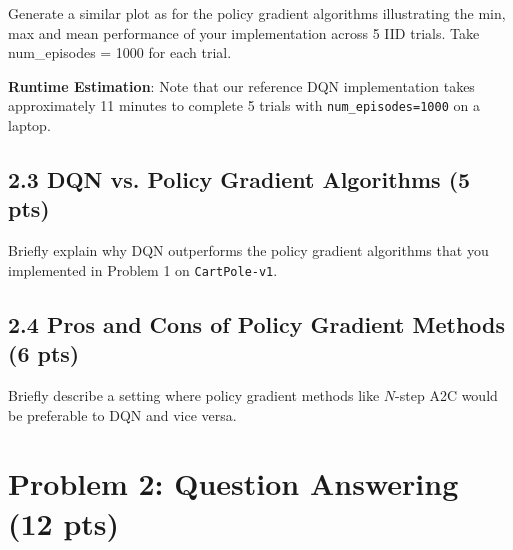 \documentclass[12pt]{article}
\begin{document}
Generate a similar plot as for the policy gradient algorithms illustrating the min, max and mean performance of your implementation across 5 IID trials. Take num\_episodes = 1000 for each trial. 

\textbf{Runtime Estimation}: Note that our reference DQN implementation takes approximately 11 minutes to complete 5 trials with \texttt{num\_episodes=1000} on a laptop.


\subsection*{2.3 DQN vs. Policy Gradient Algorithms (5 pts)}
Briefly explain why DQN outperforms the policy gradient algorithms that you implemented in Problem 1 on \texttt{CartPole-v1}. 

\subsection*{2.4 Pros and Cons of Policy Gradient Methods (6 pts)}
Briefly describe a setting where policy gradient methods like $N$-step A2C would be preferable to DQN and vice versa.
\fi

\clearpage
\section*{Problem 2: Question Answering (12 pts)}

    
    
    
    
\end{document}
